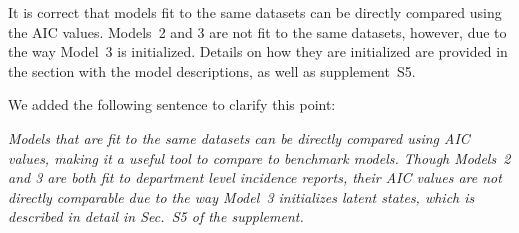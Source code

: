 \documentclass[11pt]{article}
\newcommand\article[1]{{\color{blue} \vspace{1mm}\hspace{0.25in}\parbox{6in}{\em #1}}}
\begin{document}
It is correct that models fit to the same datasets can be directly compared using the AIC values. Models~2 and 3 are not fit to the same datasets, however, due to the way Model~3 is initialized. 
Details on how they are initialized are provided in the section with the model descriptions, as well as supplement~S5. 


We added the following sentence to clarify this point:

\article{Models that are fit to the same datasets can be directly compared using AIC values, making it a useful tool to compare to benchmark models. Though Models~2 and 3 are both fit to department level incidence reports, their AIC values are not directly comparable due to the way Model~3 initializes latent states, which is described in detail in Sec.~S5 of the supplement.}
\end{document}
